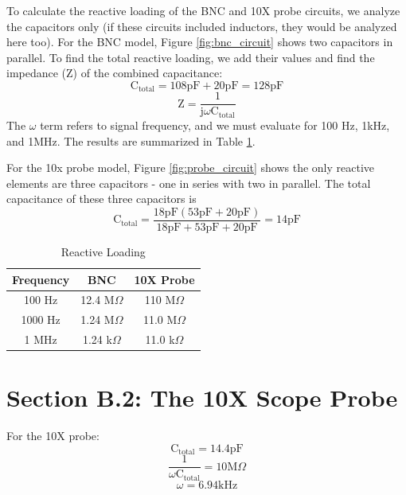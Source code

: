 \documentclass[12pt,letterpaper]{report}
\begin{document}
To calculate the reactive loading of the BNC and 10X probe circuits, we analyze the capacitors only (if these circuits included inductors, they would be analyzed here too). For the BNC model, Figure \ref{fig:bnc_circuit} shows two capacitors in parallel. To find the total reactive loading, we add their values and find the impedance (Z) of the combined capacitance:
$$ \text{C}_{\text{total}} = 108 \text{pF} + 20 \text{pF} = 128 \text{pF} $$
$$ \text{Z} = \frac{1}{\text{j}\omega\text{C}_{\text{total}}} $$
The $\omega$ term refers to signal frequency, and we must evaluate for 100 Hz, 1kHz, and 1MHz. The results are summarized in Table \ref{table:ReactiveLoading}.

For the 10x probe model, Figure \ref{fig:probe_circuit} shows the only reactive elements are three capacitors - one in series with two in parallel. The total capacitance of these three capacitors is
$$ \text{C}_{\text{total}} = \frac{18 \text{pF} (53 \text{pF} + 20 \text{pF})}{18 \text{pF} + 53 \text{pF} + 20 \text{pF}} = 14 \text{pF} $$

 
\begin{center}
\begin{table}[ht]
\caption{Reactive Loading}
\centering
	\begin{tabular}{| c | c | c |}
	\hline	
	Frequency & BNC & 10X Probe \\
	\hline
	100 Hz & 12.4 M$\Omega$ & 110 M$\Omega$\\
	1000 Hz & 1.24 M$\Omega$ & 11.0 M$\Omega$\\
	1 MHz & 1.24 k$\Omega$ & 11.0 k$\Omega$\\	
	\hline
	\end{tabular}
	\label{table:ReactiveLoading}
\end{table}
\end{center}

\section*{Section B.2: The 10X Scope Probe}

For the 10X probe:
$$\text{C}_{\text{total}} = 14.4 \text{pF}$$
$$ \frac{1}{\omega \text{C}_{\text{total}}} = 10\text{M}\Omega$$
$$ \omega = 6.94 \text{kHz} $$
\end{document}
